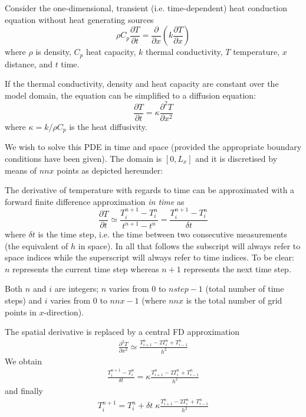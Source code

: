 Consider the one-dimensional, transient (i.e. time-dependent) 
heat conduction equation without heat generating sources
\begin{equation}
\rho C_p \frac{\partial T}{\partial t} 
= \frac{\partial }{\partial x} \left(  k  \frac{\partial T}{\partial x} \right)
\end{equation}
where $\rho$ is density, $C_p$ heat capacity, $k$ thermal conductivity, $T$ temperature, 
$x$ distance, and $t$ time. 

If the thermal conductivity, density and heat capacity are constant over the model domain, 
the equation can be simplified to a diffusion equation:
\begin{equation}
\frac{\partial T}{\partial t} =  \kappa \frac{\partial^2 T}{\partial x^2} 
\end{equation}
where $\kappa=k/\rho C_p$ is the heat diffusivity. 

We wish to solve this PDE in time and space (provided the appropriate 
boundary conditions have been given). The domain is $[0,L_x]$
and it is discretised by means of $nnx$ points as depicted hereunder:

\begin{center}

\end{center}

The derivative of temperature with regards to time can be approximated
with a forward finite difference approximation {\it in time} as
\begin{equation}
\frac{\partial T}{\partial t} 
\simeq \frac{T_{i}^{n+1}-T_i^n}{t^{n+1}-t^n} 
= \frac{T_{i}^{n+1}-T_i^n}{\delta t} 
\end{equation}
where $\delta t$ is the time step, i.e. the time between two consecutive 
measurements (the equivalent of $h$ in space). 
In all that follows the subscript will always refer to space indices 
while the superscript will always refer to time indices.
To be clear: $n$ represents the current time step whereas $n+1$
represents the next time step. 

Both $n$ and $i$ are integers; $n$ varies from 0 to $nstep-1$ (total number of time steps)
and $i$ varies from 0 to $nnx-1$ (where $nnx$ is the total number of grid points in $x$-direction).

The spatial derivative is replaced by a central FD approximation
\begin{eqnarray}
\frac{\partial^2 T}{\partial x^2} 
\simeq \frac{T_{i+1}^n - 2T_i^n + T_{i-1}^n}{h^2}
\end{eqnarray}
We obtain
\begin{eqnarray}
\frac{T_{i}^{n+1}-T_i^n}{\delta t} 
= \kappa \frac{T_{i+1}^n - 2T_i^n + T_{i-1}^n}{h^2}
\end{eqnarray}
and finally
\begin{eqnarray}
\boxed{
T_i^{n+1}=T_i^n + \delta t \; \kappa \frac{T_{i+1}^n - 2T_i^n + T_{i-1}^n}{h^2}
}
\end{eqnarray}

